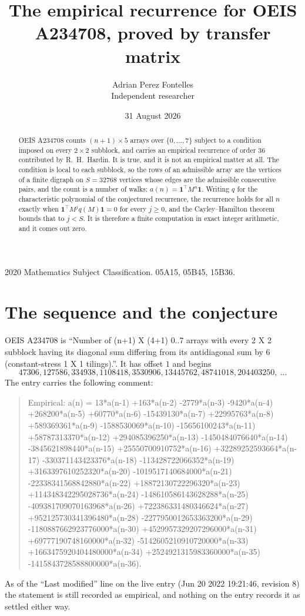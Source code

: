 \documentclass[11pt,a4paper]{article}
\title{The empirical recurrence for OEIS A234708, proved by transfer matrix}
\author{Adrian Perez Fontelles\\ \small Independent researcher}
\date{31 August 2026}
\theoremstyle{plain}
\theoremstyle{definition}
\begin{document}
\maketitle

\begin{abstract}
OEIS A234708 counts $(n+1)\times5$ arrays over $\{0,\dots,7\}$ subject to a condition imposed on
every $2\times2$ subblock, and carries an empirical recurrence of order $36$ contributed
by R.~H.~Hardin. It is true, and it is not an empirical matter at all. The condition is local
to each subblock, so the rows of an admissible array are the vertices of a finite digraph
on $S=32768$ vertices whose edges are the admissible consecutive pairs, and the count is a
number of walks: $a(n)=\mathbf{1}^{\!\top}M^{n}\mathbf{1}$. Writing $q$
for the characteristic polynomial of the conjectured recurrence, the recurrence holds for all
$n$ exactly when $\mathbf{1}^{\!\top}M^{j}q(M)\mathbf{1}=0$ for every $j\ge0$, and the
Cayley--Hamilton theorem bounds that to $j<S$. It is therefore a finite computation in exact
integer arithmetic, and it comes out zero.
\end{abstract}

\noindent\small 2020 Mathematics Subject Classification. 05A15, 05B45, 15B36.\normalsize

\section{The sequence and the conjecture}

OEIS A234708 is ``Number of (n+1) X (4+1) 0..7 arrays with every 2 X 2 subblock having its diagonal sum differing from its antidiagonal sum by 6 (constant-stress 1 X 1 tilings).''. It has offset $1$ and begins
\[
47306, 127586, 334938, 1108418, 3530906, 13445762, 48741018, 204403250,\ \dots
\]
The entry carries the following comment:
\begin{quote}\small
Empirical: a(n) = 13*a(n-1) +163*a(n-2) -2779*a(n-3) -9420*a(n-4) +268200*a(n-5) +60770*a(n-6) -15439130*a(n-7) +22995763*a(n-8) +589369361*a(n-9) -1588530069*a(n-10) -15656100243*a(n-11) +58787313370*a(n-12) +294085396250*a(n-13) -1450484076640*a(n-14) -3845621898440*a(n-15) +25550700910752*a(n-16) +32289252593664*a(n-17) -330371143423376*a(n-18) -113428722066352*a(n-19) +3163397610252320*a(n-20) -1019517140684000*a(n-21) -22338341568842880*a(n-22) +18872130722296320*a(n-23) +114348342295028736*a(n-24) -148610586143628288*a(n-25) -409381709070163968*a(n-26) +722386331480346624*a(n-27) +952125730341396480*a(n-28) -2277950012653363200*a(n-29) -1180887662923776000*a(n-30) +4529957329207296000*a(n-31) +69777190748160000*a(n-32) -5142605210910720000*a(n-33) +1663475920404480000*a(n-34) +2524921315983360000*a(n-35) -1415843728588800000*a(n-36).
\end{quote}
As of the ``Last modified'' line on the live entry (Jun 20 2022 19:21:46, revision 8) the statement is
still recorded as empirical, and nothing on the entry records it as settled either way.
\end{document}
